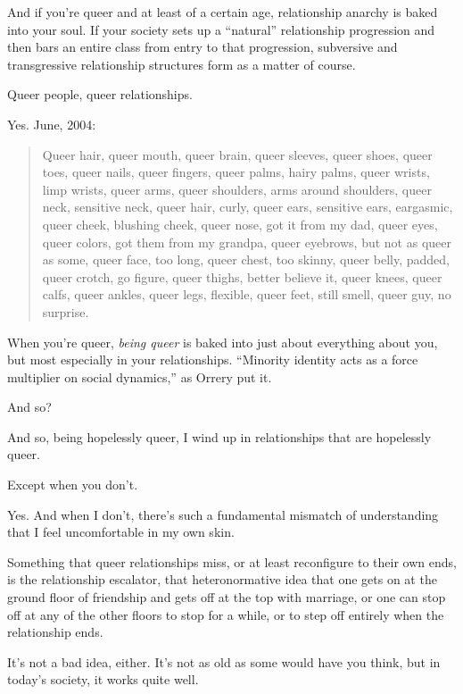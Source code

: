 \begin{paracol}{2}
\begin{leftcolumn}
And if you're queer and at least of a certain age, relationship anarchy is baked into your soul. If your society sets up a ``natural'' relationship progression and then bars an entire class from entry to that progression, subversive and transgressive relationship structures form as a matter of course.

\begin{ally}
Queer people, queer relationships.
\end{ally}
Yes. June, 2004:

\begin{quotation}
Queer hair, queer mouth, queer brain, queer sleeves, queer shoes, queer toes, queer nails, queer fingers, queer palms, hairy palms, queer wrists, limp wrists, queer arms, queer shoulders, arms around shoulders, queer neck, sensitive neck, queer hair, curly, queer ears, sensitive ears, eargasmic, queer cheek, blushing cheek, queer nose, got it from my dad, queer eyes, queer colors, got them from my grandpa, queer eyebrows, but not as queer as some, queer face, too long, queer chest, too skinny, queer belly, padded, queer crotch, go figure, queer thighs, better believe it, queer knees, queer calfs, queer ankles, queer legs, flexible, queer feet, still smell, queer guy, no surprise.
\end{quotation}

\noindent When you're queer, \emph{being queer} is baked into just about everything about you, but most especially in your relationships. ``Minority identity acts as a force multiplier on social dynamics,'' as Orrery put it.

\begin{ally}
And so?
\end{ally}
And so, being hopelessly queer, I wind up in relationships that are hopelessly queer.

\begin{ally}
Except when you don't.
\end{ally}
Yes. And when I don't, there's such a fundamental mismatch of understanding that I feel uncomfortable in my own skin.

Something that queer relationships miss, or at least reconfigure to their own ends, is the relationship escalator, that heteronormative idea that one gets on at the ground floor of friendship and gets off at the top with marriage, or one can stop off at any of the other floors to stop for a while, or to step off entirely when the relationship ends.

It's not a bad idea, either. It's not as old as some would have you think, but in today's society, it works quite well.


\end{leftcolumn}
\end{paracol}

